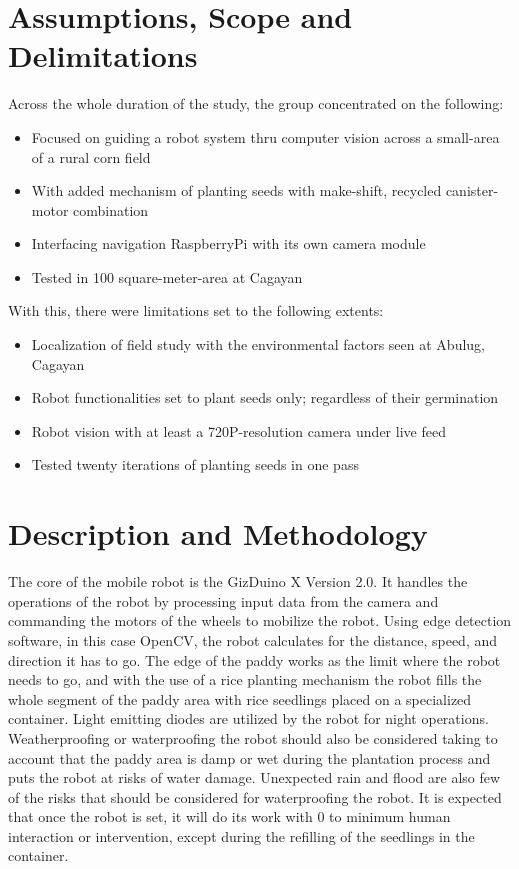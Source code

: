 \section{Assumptions, Scope and Delimitations}
Across the whole duration of the study, the group concentrated on the following:
\begin{itemize}
\item Focused on guiding a robot system thru computer vision across a small-area of a rural corn field
\item With added mechanism of planting seeds with make-shift, recycled canister-motor combination
\item Interfacing navigation RaspberryPi with its own camera module
\item Tested in 100 square-meter-area at Cagayan
\end{itemize}
 
With this, there were limitations set to the following extents:
\begin{itemize}
\item Localization of field study with the environmental factors seen at Abulug, Cagayan
\item Robot functionalities set to plant seeds only; regardless of their germination
\item Robot vision with at least a 720P-resolution camera under live feed
\item Tested twenty iterations of planting seeds in one pass
\end{itemize}

\section{Description and Methodology}

	The core of the mobile robot is the GizDuino X Version 2.0. It handles the operations of the robot by processing input data from the camera and commanding the motors of the wheels to mobilize the robot. Using edge detection software, in this case OpenCV, the robot calculates for the distance, speed, and direction it has to go. The edge of the paddy works as the limit where the robot needs to go, and with the use of a rice planting mechanism the robot fills the whole segment of the paddy area with rice seedlings placed on a specialized container. Light emitting diodes are utilized by the robot for night operations. Weatherproofing or waterproofing the robot should also be considered taking to account that the paddy area is damp or wet during the plantation process and puts the robot at risks of water damage. Unexpected rain and flood are also few of the risks that should be considered for waterproofing the robot. It is expected that once the robot is set, it will do its work with 0 to minimum human interaction or intervention, except during the refilling of the seedlings in the container. 
 
